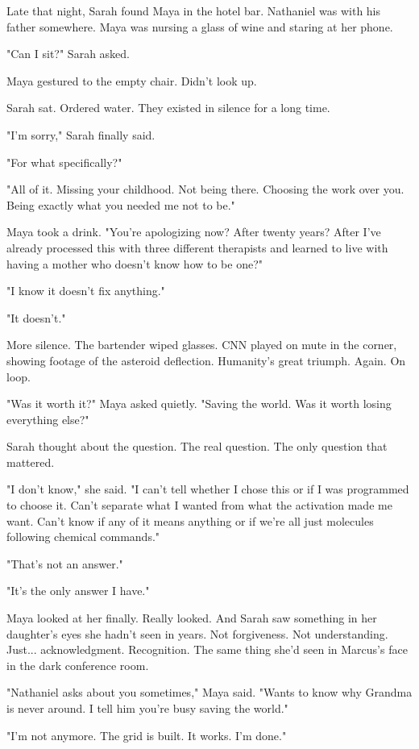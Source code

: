 Late that night, Sarah found Maya in the hotel bar. Nathaniel was with his father somewhere. Maya was nursing a glass of wine and staring at her phone.

"Can I sit?" Sarah asked.

Maya gestured to the empty chair. Didn't look up.

Sarah sat. Ordered water. They existed in silence for a long time.

"I'm sorry," Sarah finally said.

"For what specifically?"

"All of it. Missing your childhood. Not being there. Choosing the work over you. Being exactly what you needed me not to be."

Maya took a drink. "You're apologizing now? After twenty years? After I've already processed this with three different therapists and learned to live with having a mother who doesn't know how to be one?"

"I know it doesn't fix anything."

"It doesn't."

More silence. The bartender wiped glasses. CNN played on mute in the corner, showing footage of the asteroid deflection. Humanity's great triumph. Again. On loop.

"Was it worth it?" Maya asked quietly. "Saving the world. Was it worth losing everything else?"

Sarah thought about the question. The real question. The only question that mattered.

"I don't know," she said. "I can't tell whether I chose this or if I was programmed to choose it. Can't separate what I wanted from what the activation made me want. Can't know if any of it means anything or if we're all just molecules following chemical commands."

"That's not an answer."

"It's the only answer I have."

Maya looked at her finally. Really looked. And Sarah saw something in her daughter's eyes she hadn't seen in years. Not forgiveness. Not understanding. Just... acknowledgment. Recognition. The same thing she'd seen in Marcus's face in the dark conference room.

"Nathaniel asks about you sometimes," Maya said. "Wants to know why Grandma is never around. I tell him you're busy saving the world."

"I'm not anymore. The grid is built. It works. I'm done."

